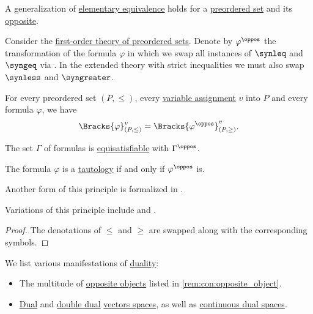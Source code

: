 \begin{theorem}\label{thm:order_duality}
  A generalization of \hyperref[def:elementary_equivalence]{elementary equivalence} holds for a \hyperref[def:preordered_set]{preordered set} and its \hyperref[def:preordered_set/opposite]{opposite}.

  Consider the \hyperref[def:preordered_set/theory]{first-order theory of preordered sets}. Denote by \( \varphi^{\oppos} \) the transformation of the formula \( \varphi \) in which we swap all instances of \( \synleq \) and \( \syngeq \) via . In the extended theory with strict inequalities we must also swap \( \synless \) and \( \syngreater \).

  \begin{thmenum}
     For every preordered set \( (P, \leq) \), every \hyperref[def:fol_variable_assignment]{variable assignment} \( v \) into \( P \) and every formula \( \varphi \), we have
    \begin{equation*}
      \Bracks{\varphi}_{(P, \leq)}^v = \Bracks{\varphi^{\oppos}}_{(P, \geq)}^v.
    \end{equation*}

     The set \( \Gamma \) of formulas is \hyperref[def:equisatisfiability]{equisatisfiable} with \( \Gamma^{\oppos} \).

     The formula \( \varphi \) is a \hyperref[def:fol_semantics/tautology]{tautology} if and only if \( \varphi^{\oppos} \) is.
  \end{thmenum}
\end{theorem}
\begin{comments}
  \item Another form of this principle is formalized in .

  \item Variations of this principle include  and .
\end{comments}
\begin{proof}
  The denotations of \( \leq \) and \( \geq \) are swapped along with the corresponding symbols.
\end{proof}

\begin{remark}\label{rem:duality}
  We list various manifestations of \hyperref[con:duality]{duality}:
  \begin{itemize}
    \item The multitude of \hyperref[con:opposite_object]{opposite objects} listed in \cref{rem:con:opposite_object}.

    \item \hyperref[def:dual_vector_space]{Dual} and \hyperref[rem:double_dual]{double dual} \hyperref[def:vector_space]{vectors spaces}, as well as \hyperref[def:continuous_dual_space]{continuous dual spaces}.
  \end{itemize}
\end{remark}

